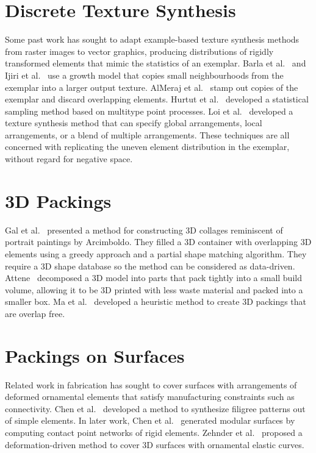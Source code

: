 \section{Discrete Texture Synthesis}
Some past work has sought to adapt example-based texture synthesis methods
from raster images to vector graphics, producing distributions of rigidly transformed elements
that mimic the statistics of an exemplar.  Barla et al.~\cite{Barla2006} and
Ijiri et al.~\cite{Ijiri2008} use a growth model that copies small neighbourhoods
from the exemplar into a larger output texture.  AlMeraj et al.~\cite{AlMeraj2013}
stamp out copies of the exemplar and discard overlapping elements.
Hurtut et al.~\cite{Hurtut2009} developed a statistical sampling method based
on multitype point processes.  
Loi et al.~\cite{Loi2017} developed a texture synthesis method that
can specify global arrangements, local arrangements, or a blend of multiple arrangements.
These techniques are all concerned with replicating
the uneven element distribution in the exemplar, without regard for negative space.

\section{3D Packings}
Gal et al.~\cite{Gal2007B} presented a method for constructing 3D
collages reminiscent of portrait paintings by Arcimboldo.  They
filled a 3D container with overlapping 3D elements using a greedy
approach and a partial shape matching algorithm.
They require a 3D shape database so the method can be considered as data-driven. 
Attene~\cite{Attene2015} decomposed a 3D model into parts that pack
tightly into a small build volume, allowing it to 
be 3D printed with less waste material and packed into a smaller box.
Ma et al.~\cite{Ma2018} developed a heuristic method
to create 3D packings that are overlap free.

\section{Packings on Surfaces}
Related work in fabrication has sought to cover surfaces with
arrangements of deformed ornamental elements that satisfy manufacturing
constraints such as connectivity.  Chen et al.~\cite{Chen2016}
developed a method to synthesize filigree patterns out of simple elements. 
In later work, Chen et al.~\cite{Chen2017}
generated modular surfaces by computing 
contact point networks of rigid elements.
Zehnder et al.~\cite{Zehnder2016} proposed a deformation-driven method to cover
3D surfaces with ornamental elastic curves.




